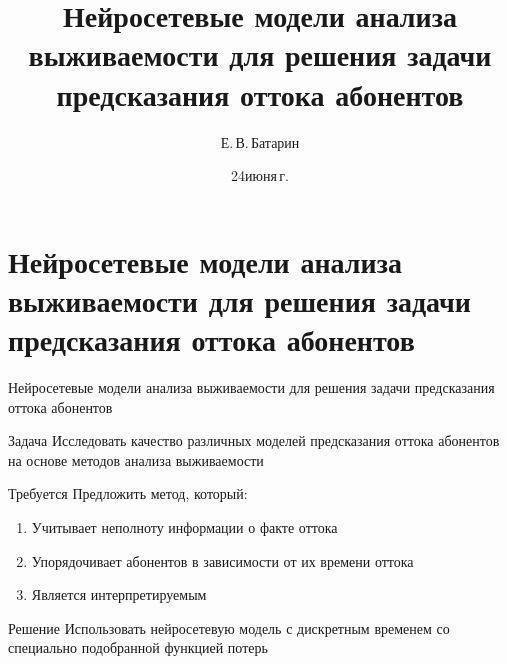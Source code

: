 \documentclass[10pt,pdf,hyperref={unicode}]{beamer}
\title[Нейросетевые модели анализа выживаемости для решения задачи предсказания оттока абонентов]{Нейросетевые модели анализа выживаемости для решения задачи предсказания оттока абонентов}
\author{Е.\,В.\,Батарин}
\institute[]{Московский физико-технический институт}
\date[2022]{\small 24\;июня\;2025\,г.}
\begin{document}
\begin{frame}
\titlepage
\end{frame}

\section{Нейросетевые модели анализа выживаемости для решения задачи предсказания оттока абонентов}
\begin{frame}{Нейросетевые модели анализа выживаемости для решения задачи предсказания оттока абонентов}
\bigskip

\begin{block}{Задача}
Исследовать качество различных моделей предсказания оттока абонентов на основе методов анализа выживаемости
\end{block}
\begin{block}{Требуется}
Предложить метод, который: 
\justifying
\begin{enumerate}[1)]
\item Учитывает неполноту информации о факте оттока
\item Упорядочивает абонентов в зависимости от их времени оттока
\item Является интерпретируемым
\end{enumerate}
\end{block}
\begin{block}{Решение}
Использовать нейросетевую модель с дискретным временем со специально подобранной функцией потерь
\end{block}
\end{frame}

\end{document}
